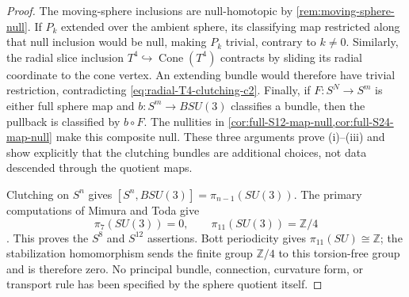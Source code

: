 \documentclass[11pt,letterpaper]{article}
\numberwithin{equation}{section}
\theoremstyle{definition}
\theoremstyle{remark}
\newcommand{\Z}{\mathbb Z}
\newcommand{\Cone}{\operatorname{Cone}}
\begin{document}
\begin{proof}
The moving-sphere inclusions are null-homotopic by
\cref{rem:moving-sphere-null}.  If \(P_k\) extended over the ambient
sphere, its classifying map restricted along that null inclusion would be
null, making \(P_k\) trivial, contrary to \(k\ne0\).  Similarly, the radial
slice inclusion \(T^4\hookrightarrow\Cone(T^4)\) contracts by sliding its
radial coordinate to the cone vertex.  An extending bundle would therefore
have trivial restriction, contradicting
\cref{eq:radial-T4-clutching-c2}.  Finally, if
\(F:S^N\to S^m\) is either full sphere map and \(b:S^m\to BSU(3)\)
classifies a bundle, then the pullback is classified by \(b\circ F\).
The nullities in
\cref{cor:full-S12-map-null,cor:full-S24-map-null} make this composite
null.  These three arguments prove (i)--(iii) and show explicitly that the
clutching bundles are additional choices, not data descended through the
quotient maps.

Clutching on \(S^n\) gives
\([S^n,BSU(3)]=\pi_{n-1}(SU(3))\).  The primary computations of Mimura and
Toda give
\begin{equation}
 \pi_7(SU(3))=0,
 \qquad
 \pi_{11}(SU(3))=\Z/4
 \label{eq:SU3-low-groups}
\end{equation}
\citep[opening table, p.~217]{MimuraToda1963}.  This proves the \(S^8\)
and \(S^{12}\) assertions.  Bott periodicity gives
\(\pi_{11}(SU)\cong\Z\); the stabilization homomorphism sends the finite
group \(\Z/4\) to this torsion-free group and is therefore zero.  No
principal bundle, connection, curvature form, or transport rule has been
specified by the sphere quotient itself.
\end{proof}
\end{document}
